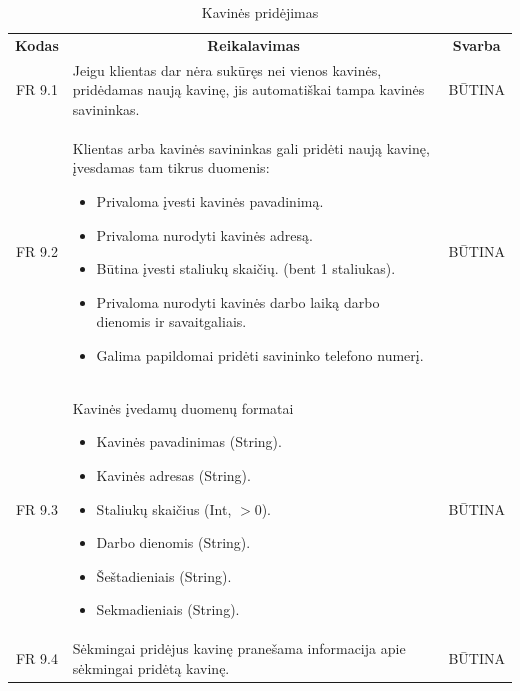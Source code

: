 \documentclass{VUMIFPSkursinis}
\begin{document}
\begin{center}
	\begin{table}[H]
	\caption{Kavinės pridėjimas}
	\begin{tabular}{|p{2cm}|p{}|p{}|}
	
	\hline
	    \rowcolor{lightgray}
		\multicolumn{3}{|c|}{Kavinės pridėjimas}\\
		
	\hline
		\multicolumn{1}{|c|}{{\bfseries Kodas}}&
		\multicolumn{1}{|c|}{{\bfseries Reikalavimas}}&
		\multicolumn{1}{|c|}{{\bfseries Svarba}}\\

	\hline
		\multicolumn{1}{|c|}{FR 9.1}&
		{Jeigu klientas dar nėra sukūręs nei vienos kavinės, pridėdamas naują kavinę, jis automatiškai tampa kavinės savininkas.}&
		\multicolumn{1}{|c|}{BŪTINA}\\	

	\hline
		\multicolumn{1}{|c|}{FR 9.2}&
		{Klientas arba kavinės savininkas gali pridėti naują kavinę, įvesdamas tam tikrus duomenis:
			\begin{itemize}
				\item Privaloma įvesti kavinės pavadinimą.
				\item Privaloma nurodyti kavinės adresą.
				\item Būtina įvesti staliukų skaičių. (bent 1 staliukas).
				\item Privaloma nurodyti kavinės darbo laiką darbo dienomis ir savaitgaliais.
				\item Galima papildomai pridėti savininko telefono numerį.
			\end{itemize}}&
		\multicolumn{1}{|c|}{BŪTINA}\\	

	\hline
		\multicolumn{1}{|c|}{FR 9.3}&
		{Kavinės įvedamų duomenų formatai
			\begin{itemize}
				\item Kavinės pavadinimas (String).
				\item Kavinės adresas (String).
				\item Staliukų skaičius (Int, $>$0).
				\item Darbo dienomis (String).
				\item Šeštadieniais (String).
				\item Sekmadieniais (String).
			\end{itemize}}&
		\multicolumn{1}{|c|}{BŪTINA}\\	

	\hline
		\multicolumn{1}{|c|}{FR 9.4}&
		{Sėkmingai pridėjus kavinę pranešama informacija apie sėkmingai pridėtą kavinę.}&
		\multicolumn{1}{|c|}{BŪTINA}\\	


\end{tabular}
\end{table}
\end{center}
\end{document}
